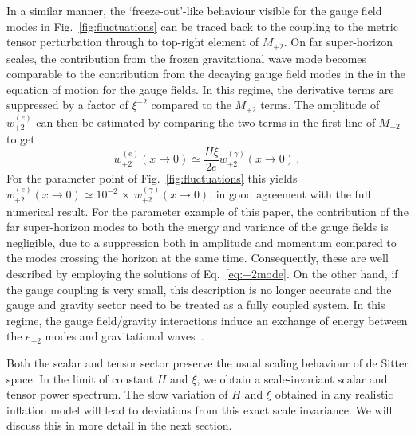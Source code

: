  
 In a similar manner, the `freeze-out'-like behaviour visible for the gauge field modes in Fig.~\ref{fig:fluctuations} can be traced back to the coupling to the metric tensor perturbation through to top-right element of $M_{+ 2}$. {On far super-horizon scales, the contribution from the frozen gravitational wave mode becomes comparable to the contribution from the decaying gauge field modes in the in the equation of motion for the gauge fields. 
 In this regime, the derivative terms are suppressed by a factor of $\xi^{-2}$ compared to the $M_{+2}$ terms.} The amplitude of $w^{(e)}_{+2}$ can then be estimated by comparing the two terms in the first line of $M_{+2}$  to get 
 \begin{equation}
  	w^{(e)}_{+2} (x \rightarrow 0)\simeq \frac{H\xi}{2 e} w^{(\gamma)}_{+2}(x \rightarrow 0)\, ,
  \end{equation} 
 For the parameter point of Fig.~\ref{fig:fluctuations} this yields  $w^{(e)}_{+2} (x \rightarrow 0)\simeq 10^{-2} \, \times \, w^{(\gamma)}_{+2}(x \rightarrow 0) $, in good agreement with the full numerical result.
For the parameter example of this paper, the contribution of the far super-horizon modes to both the energy and variance of the gauge fields is negligible, due to a suppression both in amplitude and momentum compared to the modes crossing the horizon at the same time. Consequently, these are well described by employing the solutions of Eq.~\eqref{eq:+2mode}. On the other hand, if the gauge coupling is very small, this description is no longer accurate and the gauge and gravity sector need to be treated as a fully coupled system. {In this regime, the gauge field/gravity interactions induce an exchange of energy between the $e_{\pm 2}$ modes and gravitational waves~\cite{Caldwell:2016sut, Caldwell:2017sto}.}

Both the scalar and tensor sector preserve the usual scaling behaviour of de Sitter space. In the limit of constant $H$ and $\xi$, we obtain a scale-invariant scalar and tensor power spectrum. The slow variation of $H$ and $\xi$ obtained in any realistic inflation model will lead to deviations from this exact scale invariance. We will discuss this in more detail in the next section.


 

